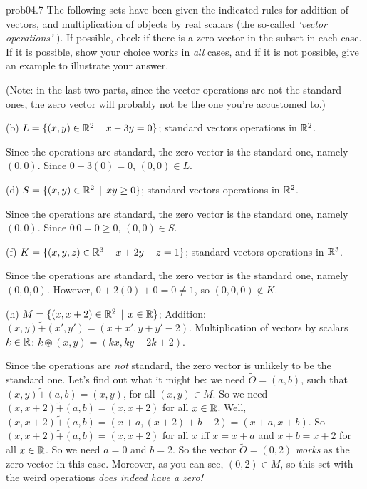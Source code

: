 \begin{sol}{prob04.7} The following sets have been given   the indicated rules for addition of vectors,  and multiplication of objects  by real scalars (the so-called  {\it `vector operations' }). If possible, check if there is a zero vector in the subset in each case. If it is possible, show your choice works in {\it all } cases, and if it is not possible, give an example to illustrate your answer. 

(Note: in the last two parts, since the vector operations are not the standard ones, the zero vector will probably not be the one you're accustomed to.)
 
\medskip
 

(b)  $L=\{(x, y) \in \mathbb{R}^2\,\mid \, x -3y=0  \}$; standard  vectors operations in $\mathbb{R}^2$. 

\soln Since the operations are standard, the zero vector is the standard one, namely $(0,0)$. Since $0- 3(0)=0$, $(0,0)\in L$. \medskip
%




(d)  $S=\{(x, y) \in \mathbb{R}^2\,\mid \, xy \ge 0  \}$;  standard  vectors operations in $\mathbb{R}^2$.  

\soln Since the operations are standard, the zero vector is the standard one, namely $(0,0)$. Since $0\, 0=0\ge 0$, $(0,0)\in S$. \medskip
%
 



(f)  $K=\{(x, y, z) \in \mathbb{R}^3\,\mid \, x+2y+z=1  \}$; standard  vectors operations in $\mathbb{R}^3$. 

\soln Since the operations are standard, the zero vector is the standard one, namely $(0,0,0)$. However, $0+2(0)+0=0\not=1$, so $(0,0,0)\notin K$.\medskip 
%


(h) $M=\{(x, x+2) \in \mathbb{R}^2\,\mid \, x\in \mathbb{R} \}$;  Addition: $(x,y) \tilde+ (x',y')=(x+x', y+y' -2)$. Multiplication of vectors  by  scalars $k\in \mathbb{R}$: $k\circledast (x,y)=(kx, ky-2k+2)$.    

\soln Since the operations are {\it not} standard, the zero vector is unlikely to be the standard one. Let's find out what it might be: we need $\tilde O=(a,b)$, such that $(x,y) \tilde+ (a,b)=(x , y )$, for all $(x,y) \in M$. So we need $(x,x+2) \tilde+ (a,b)=(x, x+2)$ for all $x\in \mathbb{R}$. Well, $(x,x+2) \tilde+ (a,b)=(x+a, (x+2)+b -2)=(x+a, x+b)$. So $(x,x+2) \tilde+ (a,b)=(x, x+2)$ for all $x$ iff $x=x+a$ and $x+b=x+2$ for all $x\in \mathbb{R}$. So we need $a=0$ and $b=2$. So the vector $\tilde O=(0,2)$ {\it works} as the zero vector in this case. Moreover, as you can see, $(0,2)\in M$, so this set with the weird operations {\it does indeed have a zero!} \medskip
%


\end{sol} 

